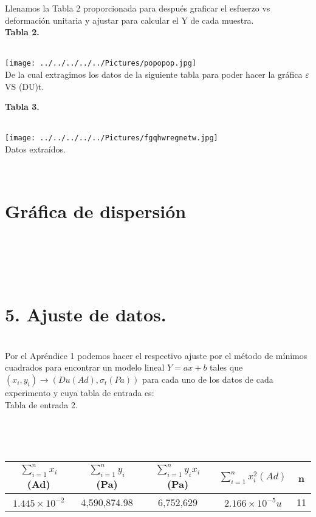 \documentclass[10pt,a4paper]{article}
\begin{document}
\medskip

Llenamos la Tabla 2 proporcionada para despu\'{e}s graficar el esfuerzo vs deformaci\'{o}n unitaria y ajustar para calcular el Y de cada muestra.\\
\textbf{Tabla 2.}\\
\\
\begin{figure 2}
\centering
\texttt{[image: ../../../../../Pictures/popopop.jpg]}
\\
\caption{De la cual extragimos los datos de la siguiente tabla para poder hacer la gr\'{a}fica $\varepsilon$ VS (DU)t.}
\end{figure 2}

\begin{figure 3}
\centering
\caption{\textbf{Tabla 3.}}
\\
\texttt{[image: ../../../../../Pictures/fgqhwregnetw.jpg]}
\\
\caption{Datos extra\'{i}dos.}
\end{figure 3}


\\
\section*{Gr\'{a}fica de dispersi\'{o}n}
\\
\\
\begin{figure 5}
\centering
\texttt{[image: ../../../../../Pictures/rrrrrrrrrrrrr.jpg]} 
\\ 
\caption{Gr\'{a}fico de dispersi\'o}n para el m\'{e}todo de nivel.}
\end{figure 5}
\\
\section*{5. Ajuste de datos.}\\
Por el Apr\'{e}ndice 1 podemos hacer el respectivo ajuste por el m\'{e}todo de m\'{i}nimos cuadrados para encontrar un modelo lineal $Y=ax +b$ tales que $\left( { x }_{ i },{ y }_{ i } \right) \rightarrow \left( Du(Ad),{ \sigma  }_{ t }(Pa) \right) $ para cada uno de los datos de cada experimento y cuya tabla de entrada es:
\medskip
\\
\caption{Tabla de entrada 2.}
\\
\begin{figure 6}
\\
\medskip  
\medskip 
\centering
\begin{tabular}{|c|c|c|c|c|}
\hline 
$\sum _{ i=1 }^{ n }{ { x }_{ i } } $(Ad) & $\sum _{ i=1 }^{ n }{ { y }_{ i } } $ (Pa) & $ \sum _{ i=1 }^{ n }{ { y }_{ i } } { x }_{ i }$ (Pa) & $\sum _{ i=1 }^{ n }{ { x }_{ i }^{ 2 } }(Ad)$ & n \\ 
\hline 
$1.445\times { 10 }^{ -2 }$& 4,590,874.98 & 6,752,629 & $2.166\times { 10 }^{ -5 }u$& 11 \\ 
\hline 
\end{tabular} 
\end{figure 6}
\\
\end{document}
